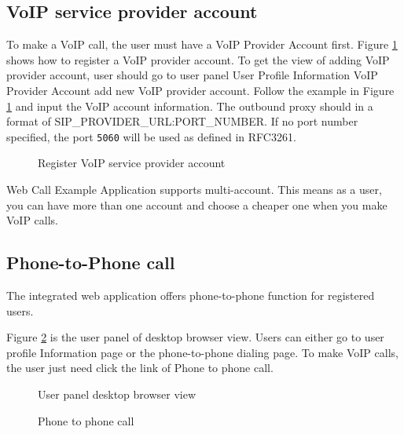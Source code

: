 \subsection{VoIP service provider account}
\label{sec:WebApplication:UserAction:VoIPServiceProviderAccount}

To make a VoIP call, the user must have a VoIP Provider Account first. Figure \ref{fig:RegisterVoIPAccount} shows how to register a VoIP provider account. To get the view of adding VoIP provider account, user should go to user panel \textrightarrow{} User Profile Information \textrightarrow{} VoIP Provider Account \textrightarrow{} add new VoIP provider account.
Follow the example in Figure \ref{fig:RegisterVoIPAccount} and input the VoIP account information. The outbound proxy should in a format of SIP\_PROVIDER\_URL:PORT\_NUMBER. If no port number specified, the port \texttt{5060} will be used as defined in RFC3261\cite{RFC3261}.

\begin{figure}[!hbtp]
\centering
{}
\caption{Register VoIP service provider account}
\label{fig:RegisterVoIPAccount}
\end{figure} 

Web Call Example Application supports multi-account. This means as a user, you can have more than one account and choose a cheaper one when you make VoIP calls.

\subsection{Phone-to-Phone call}
\label{sec:WebApplication:UserAction:Phone2PhoneCall}

The integrated web application offers phone-to-phone function for registered users. 

Figure \ref{fig:UserPanelDesktopBrowserView} is the user panel of desktop browser view. Users can either go to user profile Information page or the phone-to-phone dialing page. To make VoIP calls, the user just need click the link of Phone to phone call.

\begin{figure}[!hbtp]
\centering
{}
\caption{User panel desktop browser view}
\label{fig:UserPanelDesktopBrowserView}
\end{figure} 

\begin{figure}[!hbtp]
\centering
{}
\caption{Phone to phone call}
\label{fig:PhoneToPhoneCall}
\end{figure} 

